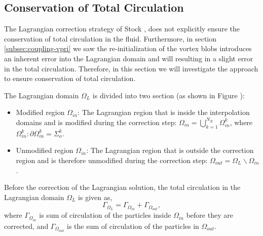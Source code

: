 	\subsection{Conservation of Total Circulation}
	\label{subsec:coupling-cotc}
	
	The Lagrangian correction strategy of Stock \cite{Stock2010a}, does not explicitly ensure the conservation of total circulation in the fluid. Furthermore, in section \ref{subsec:coupling-vpri} we saw the re-initialization of the vortex blobs introduces an inherent error into the Lagrangian domain and will resulting in a slight error in the total circulation. Therefore, in this section we will investigate the approach to ensure conservation of total circulation.
	
	The Lagrangian domain $\Omega_L$ is divided into two section (as shown in Figure ): 
		\begin{itemize}
		\item Modified region $\Omega_{in}$: The Lagrangian region that is inside the interpolation domains and is modified during the correction step: $\Omega_{in} = \bigcup_{k=1}^{N_E}{\Omega_{in}^k}$, where $\Omega_{in}^k: \partial\Omega_{in}^k = \Sigma_{o}^k$.
		\item Unmodified region $\Omega_{in}$: The Lagrangian region that is outside the correction region and is therefore unmodified during the correction step: $\Omega_{out} = \Omega_L\backslash\Omega_{in}$.
		\end{itemize}
	
	Before the correction of the Lagrangian solution, the total circulation in the Lagrangian domain $\Omega_L$ is given as,
		\begin{equation}
		\Gamma_{\Omega_L} = \Gamma_{\Omega_{in}} + \Gamma_{\Omega_{out}},
		\label{eq:couping-uncorrected}
		\end{equation}
	where $\Gamma_{\Omega_{in}}$ is sum of circulation of the particles inside $\Omega_{in}$ before they are corrected, and $\Gamma_{\Omega_{out}}$ is the sum of circulation of the particles in $\Omega_{out}$. 
	
